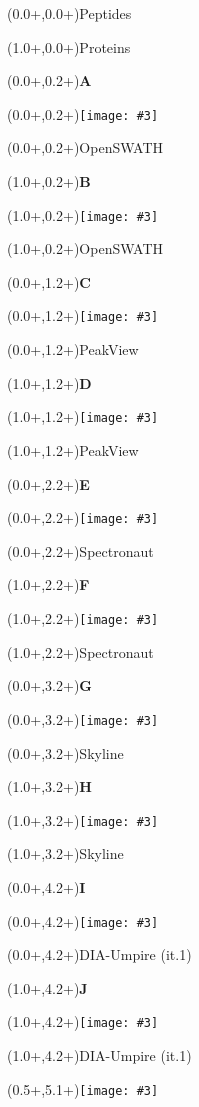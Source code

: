 \documentclass{article}
\newlength{\panelWidth} \newlength{\panelHeight}
\newlength{\labXshift} \newlength{\labYshift}
\newlength{\picXshift} \newlength{\picYshift}
\newlength{\txtXshift} \newlength{\txtYshift}
\newlength{\picWidth}
\newcommand{\txt}[3]{\begin{textblock*}{\panelWidth}(#1+\txtXshift,#2+\txtYshift){#3}\end{textblock*}}
\newcommand{\lab}[3]{\begin{textblock*}{\panelWidth}(#1+\labXshift,#2+\labYshift)\textbf{\LARGE #3}\end{textblock*}}
\newcommand{\pic}[3]{\begin{textblock*}{\panelWidth}(#1+\picXshift,#2+\picYshift)\texttt{[image: \#3]}\end{textblock*}}
\newcommand{\fig}[5]{ \lab{#1}{#2}{#3} \pic{#1}{#2}{#4} \txt{#1}{#2}{#5} }
\begin{document}

\txt{0.0\panelWidth}{0.0\panelHeight}{\LARGE Peptides}
\txt{1.0\panelWidth}{0.0\panelHeight}{\LARGE Proteins}

\fig{0.0\panelWidth}{0.2\panelHeight}{A}{./openSWATH_peptides_r2.pdf}{OpenSWATH}
\fig{1.0\panelWidth}{0.2\panelHeight}{B}{./openSWATH_r2.pdf}{OpenSWATH}
\fig{0.0\panelWidth}{1.2\panelHeight}{C}{./PeakView_peptides_r2.pdf}{PeakView}
\fig{1.0\panelWidth}{1.2\panelHeight}{D}{./PeakView_r2.pdf}{PeakView}
\fig{0.0\panelWidth}{2.2\panelHeight}{E}{./Spectronaut_peptides_r2.pdf}{Spectronaut}
\fig{1.0\panelWidth}{2.2\panelHeight}{F}{./Spectronaut_r2.pdf}{Spectronaut}
\fig{0.0\panelWidth}{3.2\panelHeight}{G}{./Skyline_peptides_r2.pdf}{Skyline}
\fig{1.0\panelWidth}{3.2\panelHeight}{H}{./Skyline_r2.pdf}{Skyline}
\fig{0.0\panelWidth}{4.2\panelHeight}{I}{./DIAumpire_peptides_r1.pdf}{DIA-Umpire (it.1)}
\fig{1.0\panelWidth}{4.2\panelHeight}{J}{./DIAumpire_r1.pdf}{DIA-Umpire (it.1)}

\pic{0.5\panelWidth}{5.1\panelHeight}{./species_legend_h.pdf}
\end{document}
